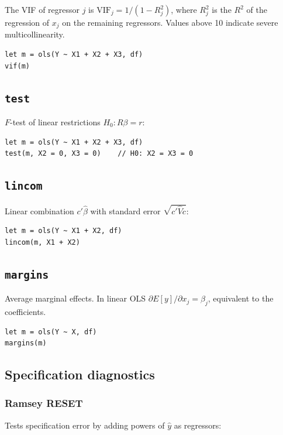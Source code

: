 The VIF of regressor $j$ is $\mathrm{VIF}_j = 1/(1 - R_j^2)$, where $R_j^2$ is the
$R^2$ of the regression of $x_j$ on the remaining regressors. Values above 10
indicate severe multicollinearity.

\begin{lstlisting}
let m = ols(Y ~ X1 + X2 + X3, df)
vif(m)
\end{lstlisting}

\subsection{\texttt{test}}

$F$-test of linear restrictions $H_0: R\beta = r$:

\begin{lstlisting}
let m = ols(Y ~ X1 + X2 + X3, df)
test(m, X2 = 0, X3 = 0)    // H0: X2 = X3 = 0
\end{lstlisting}

\subsection{\texttt{lincom}}

Linear combination $c'\hat{\beta}$ with standard error $\sqrt{c'\hat{V}c}$:

\begin{lstlisting}
let m = ols(Y ~ X1 + X2, df)
lincom(m, X1 + X2)
\end{lstlisting}

\subsection{\texttt{margins}}

Average marginal effects. In linear OLS $\partial E[y]/\partial x_j = \beta_j$,
equivalent to the coefficients.

\begin{lstlisting}
let m = ols(Y ~ X, df)
margins(m)
\end{lstlisting}

\subsection{Specification diagnostics}

\subsubsection*{Ramsey RESET}

Tests specification error by adding powers of $\hat{y}$ as regressors:

